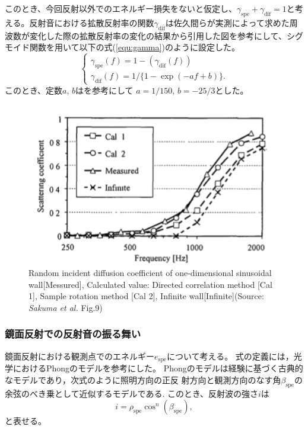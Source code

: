 このとき、今回反射以外でのエネルギー損失をないと仮定し、$\gamma_\mathrm{spe} + \gamma_\mathrm{dif} = 1 $と考える。反射音における拡散反射率の関数$\gamma_\mathrm{dif}$は佐久間らが実測によって求めた周波数が変化した際の拡散反射率の変化の結果から引用した図\cite{sakuma2004soundreflection}を参考にして、シグモイド関数を用いて以下の式(\ref{equ:gamma})のように設定した。
\begin{equation}
    \label{equ:gamma}
    \left\{
    \begin{array}{l}
        \gamma_\mathrm{spe}(f) = 1 - (\gamma_\mathrm{dif}(f))\\
        \gamma_\mathrm{dif}(f) = 1/\{1-\exp(-af + b)\} .
    \end{array}
    \right.
\end{equation}
このとき、定数$a$, $b$はを参考にして $a=1/150$, $b=-25/3$とした。

\begin{figure}[t]
  \vspace{1zh}
  \centering
    \includegraphics[width=0.7\linewidth]{images/2_diffuse_reflection_rate.png} 
  \caption{ Random incident diffusion coefficient of one-dimensional sinusoidal wall[Messured], Calculated value: Directed correlation method [Cal 1], Sample rotation method [Cal 2], Infinite wall[Infinite](Source: {\it Sakuma et al.}\cite{sakuma2004soundreflection} Fig.9)}
  \label{fig:diffuse_rate}
\end{figure}

\subsubsection{鏡面反射での反射音の振る舞い\label{spec}}
鏡面反射における観測点でのエネルギー$e_\mathrm{spe}$について考える。
式の定義には，光学におけるPhongのモデル\cite{phong1975specularreflection}を参考にした。
Phongのモデルは経験に基づく古典的なモデルであり，次式のように照明方向の正反
射方向と観測方向のなす角$\beta_\mathrm{spe}$の余弦のべき乗として近似するモデルである.
このとき、反射波の強さ$i$は
\begin{equation}
	\label{equ:phong}
	i = \rho_\mathrm{spe}\cos^{n}(\beta_\mathrm{spe}) ,
\end{equation}
と表せる。


